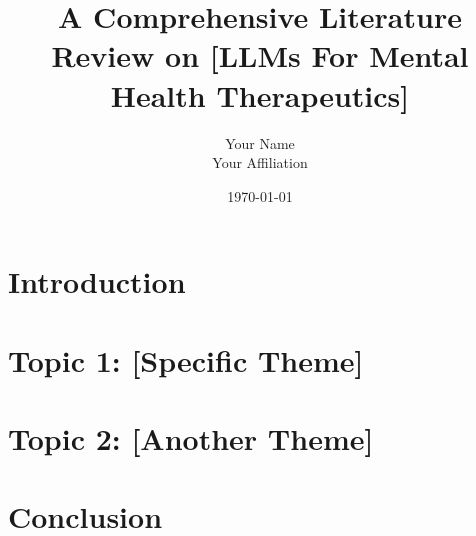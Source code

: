 \documentclass[12pt, letterpaper]{article} %
\title{A Comprehensive Literature Review on [LLMs For ​Mental Health Therapeutics​]}
\author{Your Name\\Your Affiliation}
\date{\today}
\begin{document}
\maketitle  %

\begin{abstract}
\end{abstract}

\tableofcontents %

\section{Introduction}

\section{Topic 1: [Specific Theme]}

\section{Topic 2: [Another Theme]}

\section{Conclusion}

\end{document}
